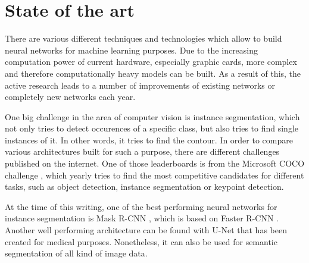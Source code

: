 
\chapter{State of the art}

There are various different techniques and technologies which allow to build neural networks for machine learning purposes. Due to the increasing computation power of current hardware, especially graphic cards, more complex and therefore computationally heavy models can be built. As a result of this, the active research leads to a number of improvements of existing networks or completely new networks each year.

One big challenge in the area of computer vision is instance segmentation, which not only tries to detect occurences of a specific class, but also tries to find single instances of it. In other words, it tries to find the contour. In order to compare various architectures built for such a purpose, there are different challenges published on the internet. One of those leaderboards is from the Microsoft COCO challenge \cite{Lin.20150221}, which yearly tries to find the most competitive candidates for different tasks, such as object detection, instance segmentation or keypoint detection.

At the time of this writing, one of the best performing neural networks for instance segmentation is Mask R-CNN \cite{He.20170405}, which is based on Faster R-CNN \cite{Ren.20160106}.
Another well performing architecture can be found with U-Net \cite{Ronneberger.20150518b} that has been created for medical purposes. Nonetheless, it can also be used for semantic segmentation of all kind of image data.